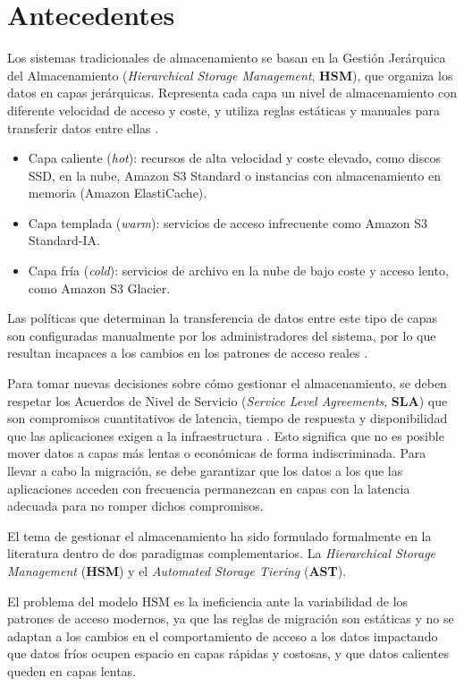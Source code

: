 \section{Antecedentes}
Los sistemas tradicionales de almacenamiento se basan en la Gestión Jerárquica del Almacenamiento (\textit{Hierarchical Storage Management}, \textbf{HSM}), que organiza los datos en capas jerárquicas.
Representa cada capa un nivel de almacenamiento con diferente velocidad de acceso y coste, y utiliza reglas estáticas y manuales para transferir datos entre ellas \parencite{guerra2011tiering}.
\begin{itemize}
    \item Capa caliente (\textit{hot}): recursos de alta velocidad y coste elevado, como discos SSD, en la nube, Amazon S3 Standard o instancias con almacenamiento en memoria (Amazon ElastiCache).
    \item Capa templada (\textit{warm}): servicios de acceso infrecuente como Amazon S3 Standard-IA.
    \item Capa fría (\textit{cold}): servicios de archivo en la nube de bajo coste y acceso lento, como Amazon S3 Glacier.
\end{itemize}
Las políticas que determinan la transferencia de datos entre este tipo de capas son configuradas manualmente por los administradores del sistema,
por lo que resultan incapaces a los cambios en los patrones de acceso reales \parencite{guerra2011tiering}.

Para tomar nuevas decisiones sobre cómo gestionar el almacenamiento, se deben respetar los Acuerdos de Nivel de Servicio (\textit{Service Level Agreements}, \textbf{SLA}) que son compromisos cuantitativos de latencia, tiempo de respuesta y disponibilidad que las aplicaciones exigen a la infraestructura \parencite{verma2015sla}.
Esto significa que no es posible mover datos a capas más lentas o económicas de forma indiscriminada.
Para llevar a cabo la migración, se debe garantizar que los datos a los que las aplicaciones acceden con frecuencia permanezcan en capas con la latencia adecuada para no romper dichos compromisos.

El tema de gestionar el almacenamiento ha sido formulado formalmente en la literatura dentro de dos paradigmas complementarios.
La \textit{Hierarchical Storage Management} (\textbf{HSM}) y el \textit{Automated Storage Tiering} (\textbf{AST}).

El problema del modelo HSM es la ineficiencia ante la variabilidad de los patrones de acceso modernos, ya que las reglas de migración son estáticas y no se adaptan a los cambios en el comportamiento de acceso a los datos impactando que datos fríos ocupen espacio en capas rápidas y costosas, y que datos calientes queden en capas lentas.

